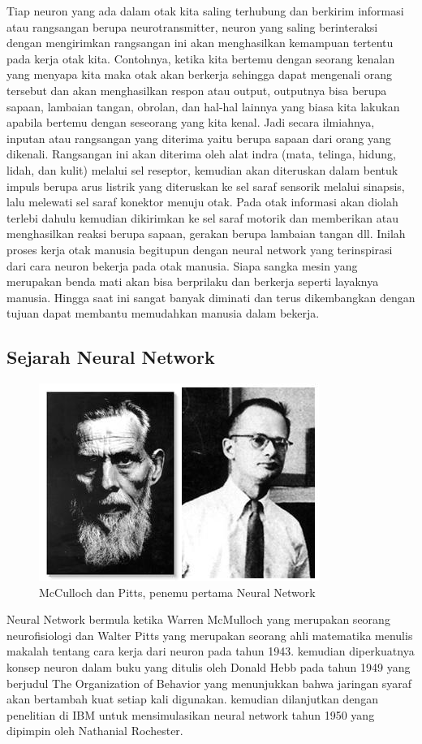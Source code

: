 Tiap neuron yang ada dalam otak kita saling terhubung dan berkirim informasi atau rangsangan berupa neurotransmitter, neuron yang saling berinteraksi dengan mengirimkan rangsangan ini akan menghasilkan kemampuan tertentu pada kerja otak kita. Contohnya, ketika kita bertemu dengan seorang kenalan yang menyapa kita maka otak akan berkerja sehingga dapat mengenali orang tersebut dan akan menghasilkan respon atau output, outputnya bisa berupa sapaan, lambaian tangan, obrolan, dan hal-hal lainnya yang biasa kita lakukan apabila bertemu dengan seseorang yang kita kenal. Jadi secara ilmiahnya, inputan atau rangsangan yang diterima yaitu berupa sapaan dari orang yang dikenali. Rangsangan ini akan diterima oleh alat indra (mata, telinga, hidung, lidah, dan kulit) melalui sel reseptor, kemudian akan diteruskan dalam bentuk impuls berupa arus listrik yang diteruskan ke sel saraf sensorik melalui sinapsis, lalu melewati sel saraf konektor menuju otak. Pada otak informasi akan diolah terlebi dahulu kemudian dikirimkan ke sel saraf motorik dan memberikan atau menghasilkan reaksi berupa sapaan, gerakan berupa lambaian tangan dll. Inilah proses kerja otak manusia begitupun dengan neural network yang terinspirasi dari cara neuron bekerja pada otak manusia. Siapa sangka mesin yang merupakan benda mati akan bisa berprilaku dan berkerja seperti layaknya manusia. Hingga saat ini sangat banyak diminati dan terus dikembangkan dengan tujuan dapat membantu memudahkan manusia dalam bekerja.

\subsection{Sejarah Neural Network}
\begin{figure}[H]
        \centerline{\includegraphics[scale=1]{figures/nn1}}
        \caption{McCulloch dan Pitts, penemu pertama Neural Network}
		\label{penemu}
\end{figure}
Neural Network bermula ketika Warren McMulloch yang merupakan seorang neurofisiologi dan Walter Pitts yang merupakan seorang ahli matematika menulis makalah tentang cara kerja dari neuron pada tahun 1943. kemudian diperkuatnya konsep neuron dalam buku yang ditulis oleh Donald Hebb pada tahun 1949 yang berjudul The Organization of Behavior yang menunjukkan bahwa jaringan syaraf akan bertambah kuat setiap kali digunakan. kemudian dilanjutkan dengan penelitian di IBM untuk mensimulasikan neural network tahun 1950 yang dipimpin oleh Nathanial Rochester.

